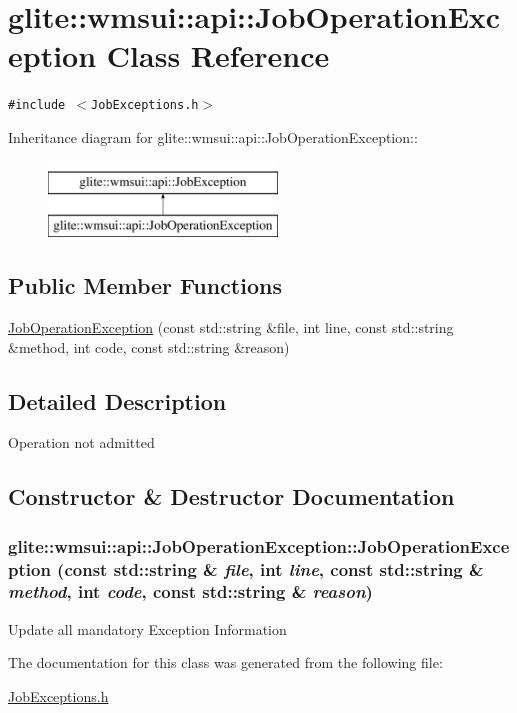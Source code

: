 \hypertarget{classglite_1_1wmsui_1_1api_1_1JobOperationException}{
\section{glite::wmsui::api::Job\-Operation\-Exception Class Reference}
\label{classglite_1_1wmsui_1_1api_1_1JobOperationException}
}
{\tt \#include $<$Job\-Exceptions.h$>$}

Inheritance diagram for glite::wmsui::api::Job\-Operation\-Exception::\begin{figure}[H]
\begin{center}
\leavevmode
\includegraphics[height=2cm]{classglite_1_1wmsui_1_1api_1_1JobOperationException}
\end{center}
\end{figure}
\subsection*{Public Member Functions}
\begin{CompactItemize}
\item 
\hyperlink{classglite_1_1wmsui_1_1api_1_1JobOperationException_a0}{Job\-Operation\-Exception} (const std::string \&file, int line, const std::string \&method, int code, const std::string \&reason)
\end{CompactItemize}


\subsection{Detailed Description}
Operation not admitted 



\subsection{Constructor \& Destructor Documentation}
\hypertarget{classglite_1_1wmsui_1_1api_1_1JobOperationException_a0}{
\subsubsection[JobOperationException]{\setlength{\rightskip}{0pt plus 5cm}glite::wmsui::api::Job\-Operation\-Exception::Job\-Operation\-Exception (const std::string \& {\em file}, int {\em line}, const std::string \& {\em method}, int {\em code}, const std::string \& {\em reason})}}
\label{classglite_1_1wmsui_1_1api_1_1JobOperationException_a0}


Update all mandatory Exception Information 

The documentation for this class was generated from the following file:\begin{CompactItemize}
\item 
\hyperlink{JobExceptions_8h}{Job\-Exceptions.h}\end{CompactItemize}
